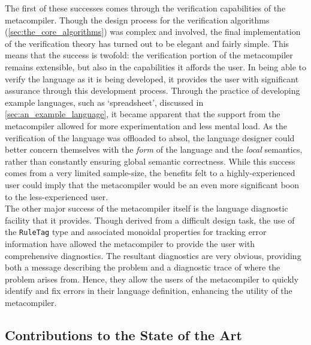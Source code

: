 The first of these successes comes through the verification capabilities of the metacompiler. 
Though the design process for the verification algorithms (\autoref{sec:the_core_algorithms}) was complex and involved, the final implementation of the verification theory has turned out to be elegant and fairly simple.
This means that the success is twofold: the verification portion of the metacompiler remains extensible, but also in the capabilities it affords the user.
In being able to verify the language as it is being developed, it provides the user with significant assurance through this development process.
Through the practice of developing example languages, such as `spreadsheet', discussed in \autoref{sec:an_example_language}, it became apparent that the support from the metacompiler allowed for more experimentation and less mental load.
As the verification of the language was offloaded to \gls{absol}, the language designer could better concern themselves with the \textit{form} of the language and the \textit{local} semantics, rather than constantly ensuring global semantic correctness.
While this success comes from a very limited sample-size, the benefits felt to a highly-experienced user could imply that the metacompiler would be an even more significant boon to the less-experienced user. \\

The other major success of the metacompiler itself is the language diagnostic facility that it provides.
Though derived from a difficult design task, the use of the \texttt{RuleTag} type and associated monoidal properties for tracking error information have allowed the metacompiler to provide the user with comprehensive diagnostics.
The resultant diagnostics are very obvious, providing both a message describing the problem and a diagnostic trace of where the problem arises from.
Hence, they allow the users of the metacompiler to quickly identify and fix errors in their language definition, enhancing the utility of the metacompiler.


\subsection{Contributions to the State of the Art} %
\label{sub:contributions_to_the_state_of_the_art}

